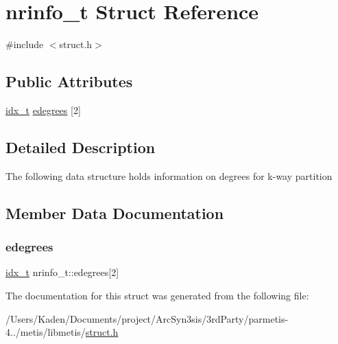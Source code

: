 \hypertarget{a00730}{}\section{nrinfo\+\_\+t Struct Reference}
\label{a00730}


{\ttfamily \#include $<$struct.\+h$>$}

\subsection*{Public Attributes}
\begin{DoxyCompactItemize}
\item 
\hyperlink{a00876_aaa5262be3e700770163401acb0150f52}{idx\+\_\+t} \hyperlink{a00730_a39e2adc4b240da74c5b8b89007825ed1}{edegrees} \mbox{[}2\mbox{]}
\end{DoxyCompactItemize}


\subsection{Detailed Description}
The following data structure holds information on degrees for k-\/way partition 

\subsection{Member Data Documentation}
\mbox{\label{a00730_a39e2adc4b240da74c5b8b89007825ed1}} 
\subsubsection{\texorpdfstring{edegrees}{edegrees}}
{\footnotesize\ttfamily \hyperlink{a00876_aaa5262be3e700770163401acb0150f52}{idx\+\_\+t} nrinfo\+\_\+t\+::edegrees\mbox{[}2\mbox{]}}



The documentation for this struct was generated from the following file\+:\begin{DoxyCompactItemize}
\item 
/\+Users/\+Kaden/\+Documents/project/\+Arc\+Syn3sis/3rd\+Party/parmetis-\/4../metis/libmetis/\hyperlink{a00972}{struct.\+h}\end{DoxyCompactItemize}
